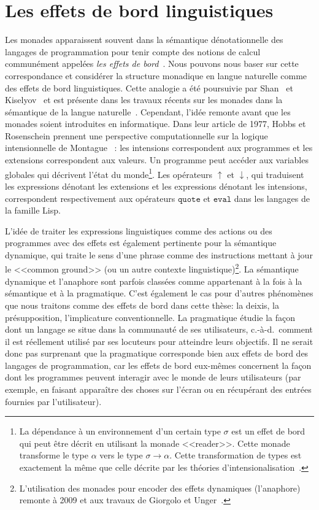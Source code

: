 \section*{Les effets de bord linguistiques}

Les monades apparaissent souvent dans la sémantique dénotationnelle des langages
de programmation pour tenir compte des notions de calcul communément appelées
\emph {les effets de bord}~\cite{moggi1991notions}. Nous pouvons nous baser sur
cette correspondance et considérer la structure monadique en langue naturelle
comme des effets de bord linguistiques. Cette analogie a été poursuivie par
Shan~\cite{shan2005linguistic,shan2005thesis} et
Kiselyov~\cite{kiselyov2008call} et est présente dans les travaux récents sur
les monades dans la sémantique de la langue naturelle~\cite{giorgolo2012monads,charlow2014semantics}. Cependant, l'idée remonte avant que les monades soient introduites en informatique. Dans leur
article de 1977, Hobbs et Rosenschein prennent une perspective computationnelle
sur la logique intensionnelle de Montague~\cite{montague1973proper} : les
intensions correspondent aux programmes et les extensions correspondent aux
valeurs. Un programme peut accéder aux variables globales qui décrivent l'état
du monde\footnote{La dépendance à un environnement d'un certain type $\sigma$
  est un effet de bord qui peut être décrit en utilisant la monade <<reader>>.
  Cette monade transforme le type $\alpha$ vers le type $\sigma \to \alpha$. Cette
  transformation de types est exactement la même que celle décrite par les théories
  d'intensionalisation~\cite{ben2007semantics,de2013note}.}. Les opérateurs
$\uparrow$ et $\downarrow$, qui traduisent les expressions
dénotant les extensions et les expressions dénotant les intensions,
correspondent respectivement aux opérateurs $\texttt{quote} $ et $\texttt{eval}$
dans les langages de la famille Lisp.

L'idée de traiter les expressions linguistiques comme des actions ou des
programmes avec des effets est également pertinente pour la sémantique
dynamique, qui traite le sens d'une phrase comme des instructions mettant à
jour le <<common ground>> (ou un autre contexte
linguistique)\footnote{L'utilisation des monades pour encoder des effets
  dynamiques (l'anaphore) remonte à 2009 et aux travaux de Giorgolo et
  Unger~\cite{giorgolo2009coreference,unger2012dynamic}.}. La sémantique
dynamique et l'anaphore sont parfois classées comme appartenant à la fois à la
sémantique et à la pragmatique. C'est également le cas pour d'autres phénomènes
que nous traitons comme des effets de bord dans cette thèse: la deixis, la
présupposition, l'implicature conventionnelle. La pragmatique étudie la façon
dont un langage se situe dans la communauté de ses utilisateurs, c.-à-d.\ comment
il est réellement utilisé par ses locuteurs pour atteindre leurs objectifs. Il
ne serait donc pas surprenant que la pragmatique corresponde bien aux effets de
bord des langages de programmation, car les effets de bord eux-mêmes concernent
la façon dont les programmes peuvent interagir avec le monde de leurs
utilisateurs (par exemple, en faisant apparaître des choses sur l'écran ou en
récupérant des entrées fournies par l'utilisateur).


